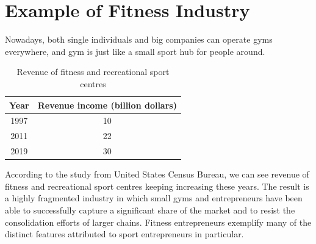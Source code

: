 \documentclass[12pt]{article}
\begin{document}
\section{Example of Fitness Industry} 
Nowadays, both single individuals and big companies can operate gyms everywhere, and gym is just like a small sport hub for people around. 
\begin{table}[H]
\centering
\begin{tabular}{|c|c|}
\hline
Year & Revenue income (billion dollars) \\ \hline
1997 & 10                               \\ \hline
2011 & 22                               \\ \hline
2019 & 30                               \\ \hline
\end{tabular}
\caption{Revenue of fitness and recreational sport centres}
\end{table}
According to the study from United States Census Bureau, we can see revenue of fitness and recreational sport centres keeping increasing these years. The result is a highly fragmented industry in which small gyms and entrepreneurs have been able to successfully capture a significant share of the market and to resist the consolidation efforts of larger chains. Fitness entrepreneurs exemplify many of the distinct features attributed to sport entrepreneurs in particular.  
\end{document}
